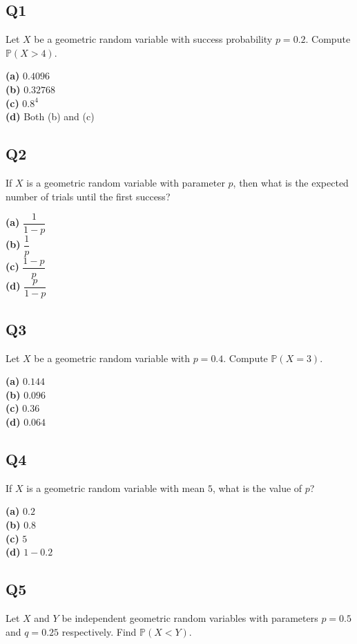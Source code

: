 \subsection*{Q1}
Let $X$ be a geometric random variable with success probability $p = 0.2$. Compute $\mathbb{P}(X > 4)$.

\textbf{(a)} $0.4096$  \\
\textbf{(b)} $0.32768$  \\
\textbf{(c)} $0.8^4$  \\
\textbf{(d)} Both (b) and (c)

\subsection*{Q2}
If $X$ is a geometric random variable with parameter $p$, then what is the expected number of trials until the first success?

\textbf{(a)} $\dfrac{1}{1 - p}$  \\
\textbf{(b)} $\dfrac{1}{p}$  \\
\textbf{(c)} $\dfrac{1 - p}{p}$  \\
\textbf{(d)} $\dfrac{p}{1 - p}$

\subsection*{Q3}
Let $X$ be a geometric random variable with $p = 0.4$. Compute $\mathbb{P}(X = 3)$.

\textbf{(a)} $0.144$  \\
\textbf{(b)} $0.096$  \\
\textbf{(c)} $0.36$  \\
\textbf{(d)} $0.064$

\subsection*{Q4}
If $X$ is a geometric random variable with mean $5$, what is the value of $p$?

\textbf{(a)} $0.2$  \\
\textbf{(b)} $0.8$  \\
\textbf{(c)} $5$  \\
\textbf{(d)} $1 - 0.2$

\subsection*{Q5}
Let $X$ and $Y$ be independent geometric random variables with parameters $p = 0.5$ and $q = 0.25$ respectively. Find $\mathbb{P}(X < Y)$.

